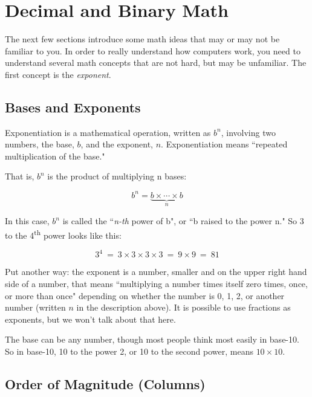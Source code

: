 \section{Decimal and Binary Math}

The next few sections introduce some math ideas that may or may not be familiar to you. In order to really understand how computers work, you need to understand several math concepts that are not hard, but may be unfamiliar. The first concept is the \emph{exponent}. 

\subsection*{Bases and Exponents}

Exponentiation is a mathematical operation, written as $b^n$, involving two numbers, the base, $b$, and the exponent, $n$. Exponentiation means ``repeated multiplication of the base." 

\noindent That is, $b^n$ is the product of multiplying n bases:


\begin{equation*}
b^{n}=\underbrace {b\times \cdots \times b} _{n}
\end{equation*}

\noindent In this case, $b^n$ is called the ``\emph{n-th} power of b", or ``b raised to the power n." So 3 to the 4\textsuperscript{th} power looks like this: 

\begin{equation*}
3^4 ~=~ 3 \times 3 \times 3 \times 3 ~=~ 9 \times 9 ~=~  81
\end{equation*}



Put another way: the exponent is a number, smaller and on the upper right hand side of a number, that means ``multiplying a number times itself zero times, once, or more than once" depending on whether the number is 0, 1, 2, or another number (written $n$ in the description above). It is possible to use fractions as exponents, but we won't talk about that here.

The base can be any number, though most people think most easily in base-10. So in base-10, 10 to the power 2, or 10 to the second power, means $10 \times 10$. 

\subsection*{Order of Magnitude (Columns)}

